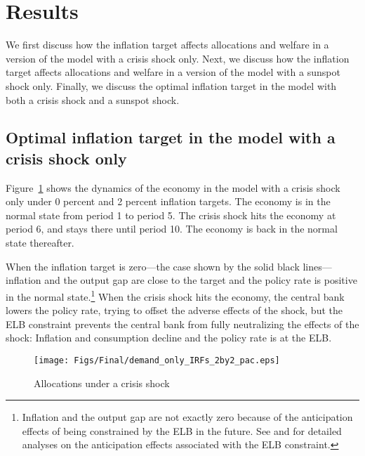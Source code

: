 \documentclass[11pt]{article}
\begin{document}
	\section{Results}
	\label{S:StylizedResults}

	We first discuss how the inflation target affects allocations and welfare in a version of the model with a crisis shock only. Next, we discuss how the inflation target affects allocations and welfare in a version of the model with a sunspot shock only. Finally, we discuss the optimal inflation target in the model with both a crisis shock and a sunspot shock.

	\subsection{Optimal inflation target in the model with a crisis shock only}

	Figure~\ref{fig:IRFs_Target} shows the dynamics of the economy in the model with a crisis shock only under 0 percent and 2 percent inflation targets. The economy is in the normal state from period 1 to period 5. The crisis shock hits the economy at period 6, and stays there until period 10. The economy is back in the normal state thereafter.

	When the inflation target is zero---the case shown by the solid black lines---inflation and the output gap are close to the target and the policy rate is positive in the normal state.\footnote{Inflation and the output gap are not exactly zero because of the anticipation effects of being constrained by the ELB in the future. See \citet{HillsNakataSchmidt2016} and \citet{NakataSchmidtForthcomingJME} for detailed analyses on the anticipation effects associated with the ELB constraint.} When the crisis shock hits the economy, the central bank lowers the policy rate, trying to offset the adverse effects of the shock, but the ELB constraint prevents the central bank from fully neutralizing the effects of the shock: Inflation and consumption decline and the policy rate is at the ELB.


	\begin{figure}[!h]
		\begin{center}
			\caption{Allocations under a crisis shock\label{fig:IRFs_Target}}
			\texttt{[image: Figs/Final/demand\_only\_IRFs\_2by2\_pac.eps]}\\
		\end{center}
	\end{figure}
\end{document}

